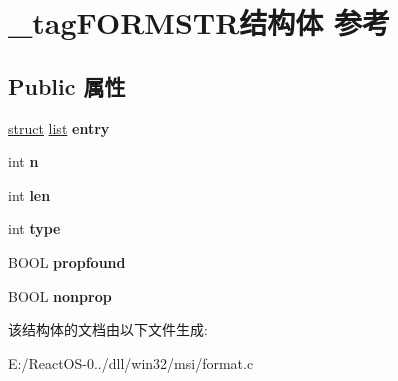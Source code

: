 \hypertarget{struct__tag_f_o_r_m_s_t_r}{}\section{\+\_\+tag\+F\+O\+R\+M\+S\+T\+R结构体 参考}
\label{struct__tag_f_o_r_m_s_t_r}
\subsection*{Public 属性}
\begin{DoxyCompactItemize}
\item 
\mbox{\label{struct__tag_f_o_r_m_s_t_r_a193715eb3039a910e771466e24ca992b}} 
\hyperlink{interfacestruct}{struct} \hyperlink{classlist}{list} {\bfseries entry}
\item 
\mbox{\label{struct__tag_f_o_r_m_s_t_r_a4955514775f7939f1621bef12ef2467c}} 
int {\bfseries n}
\item 
\mbox{\label{struct__tag_f_o_r_m_s_t_r_adff1636fc15067db56e743ae2078d503}} 
int {\bfseries len}
\item 
\mbox{\label{struct__tag_f_o_r_m_s_t_r_a81a1e0932e6bf126b39eba130ebcba02}} 
int {\bfseries type}
\item 
\mbox{\label{struct__tag_f_o_r_m_s_t_r_a8e24c13fb31c66bae730b1067b9c13a8}} 
B\+O\+OL {\bfseries propfound}
\item 
\mbox{\label{struct__tag_f_o_r_m_s_t_r_a5ddfa26257c63c2317d372804061a5ef}} 
B\+O\+OL {\bfseries nonprop}
\end{DoxyCompactItemize}


该结构体的文档由以下文件生成\+:\begin{DoxyCompactItemize}
\item 
E\+:/\+React\+O\+S-\/0../dll/win32/msi/format.\+c\end{DoxyCompactItemize}
